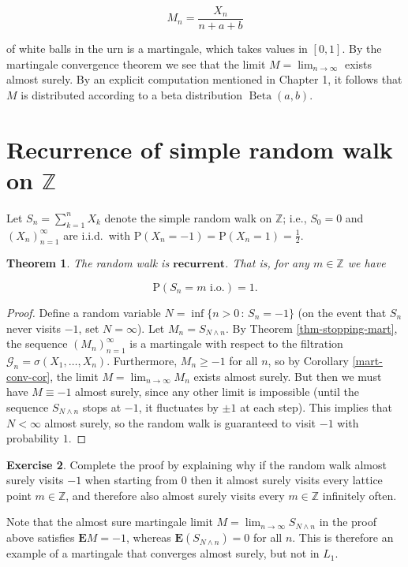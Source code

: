 \documentclass[11pt]{report}
\newcommand{\Z}{\mathbb{Z}}
\theoremstyle{plain}
\newtheorem{thm}{Theorem}[chapter]
\theoremstyle{definition}
\newtheorem{xexercise}[thm]{Exercise}
\begin{document}
\[
M_n = \frac{X_n}{n+a+b}
\]

of white balls in the urn is a martingale, which takes values in $[0,1]$. By the martingale convergence theorem we see that the limit $M = \lim_{n\to\infty}$ exists almost surely. By an explicit computation mentioned in Chapter 1, it follows that $M$ is distributed according to a beta distribution $\operatorname{Beta}(a,b)$.

\section{Recurrence of simple random walk on $\mathbb{Z}$}
Let $S_n = \sum_{k=1}^n X_k$ denote the simple random walk on $\Z$; i.e., $S_0=0$ and $(X_n)_{n=1}^\infty$ are i.i.d.\ with $\mathrm{P}(X_n=-1)=\mathrm{P}(X_n=1)=\tfrac12$.

\begin{thm}
The random walk is $\textbf{recurrent}$. That is, for any $m\in\Z$ we have

\[
\mathrm{P}(S_n = m \textrm{ i.o.}) = 1.
\]

\end{thm}

\begin{proof}
Define a random variable $N = \inf \{ n>0\,:\, S_n = -1 \}$ (on the event that $S_n$ never visits $-1$, set $N=\infty$). Let $M_n = S_{N\wedge n}$. By Theorem \ref{thm-stopping-mart}, the sequence $(M_n)_{n=1}^\infty$ is a martingale with respect to the filtration $\mathcal{G}_n = \sigma(X_1,\ldots,X_n)$. Furthermore, $M_n \ge -1$ for all $n$, so by Corollary \ref{mart-conv-cor}, the limit $M=\lim_{n\to\infty} M_n$ exists almost surely. But then we must have $M\equiv -1$ almost surely, since any other limit is impossible (until the sequence $S_{N\wedge n}$ stops at $-1$, it fluctuates by $\pm 1$ at each step). This implies that $N<\infty$ almost surely, so the random walk is guaranteed to visit $-1$ with probability $1$.
\end{proof}

\begin{xexercise}
Complete the proof by explaining why if the random walk almost surely visits $-1$ when starting from $0$ then it almost surely visits every lattice point $m\in\Z$, and therefore also almost surely visits every $m\in\Z$ infinitely often.
\end{xexercise}

Note that the almost sure martingale limit $M=\lim_{n\to\infty} S_{N\wedge n}$ in the proof above satisfies $\mathbf{E} M=-1$, whereas $\mathbf{E}(S_{N \wedge n})=0$ for all $n$. This is therefore an example of a martingale that converges almost surely, but not in $L_1$.
\end{document}
